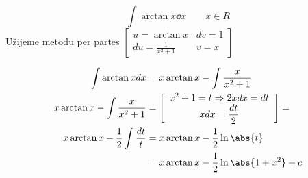 \begin{mdframed}[style=mdexam]
  \begin{example}\label{mai:exam113}
    \begin{equation}\label{mai:exam016_002}
      \int{\arctan x\dd{x}}\qquad x\in R
    \end{equation}
    Užijeme metodu per partes 
       \(\left[\begin{array}{cc} 
                u =\arctan x                     &  dv= 1  \\ 
               du =\displaystyle\frac{1}{x^2+1}  &   v= x
             \end{array}
       \right]\)
       
    \begin{align*}
       \int{\arctan xdx}                      &= x\arctan x-\int\frac{x}{x^2+1}         \\
       x\arctan x-\int\frac{x}{x^2+1}         &= 
         \left[\begin{array}{c} 
                  x^2 + 1 = t  \Rightarrow 2xdx = dt        \\ 
                      xdx = \displaystyle{\frac{dt}{2}}
               \end{array} 
         \right] =                                                                    \\ 
       x\arctan x-\frac{1}{2}\int\frac{dt}{t} &= x\arctan x-\frac{1}{2}\ln\abs{t}     \\
         &=   x\arctan x-\frac{1}{2}\ln\abs{1+x^2}+ c                                 \\
    \end{align*}
  \end{example}
\end{mdframed}